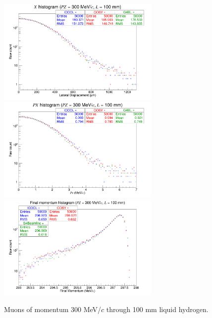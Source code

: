 \begin{figure}[!htb]
  \centering
    \includegraphics[width=0.7\textwidth]{Benchmarking/LH/X.300.100.png} 
    \includegraphics[width=0.7\textwidth]{Benchmarking/LH/PX.300.100.png} 
    \includegraphics[width=0.7\textwidth]{Benchmarking/LH/strag.300.100.png} 
  \caption{Muons of momentum 300 MeV/$c$ through 100 mm liquid hydrogen.}
  \label{fig:300.100}
\end{figure}

